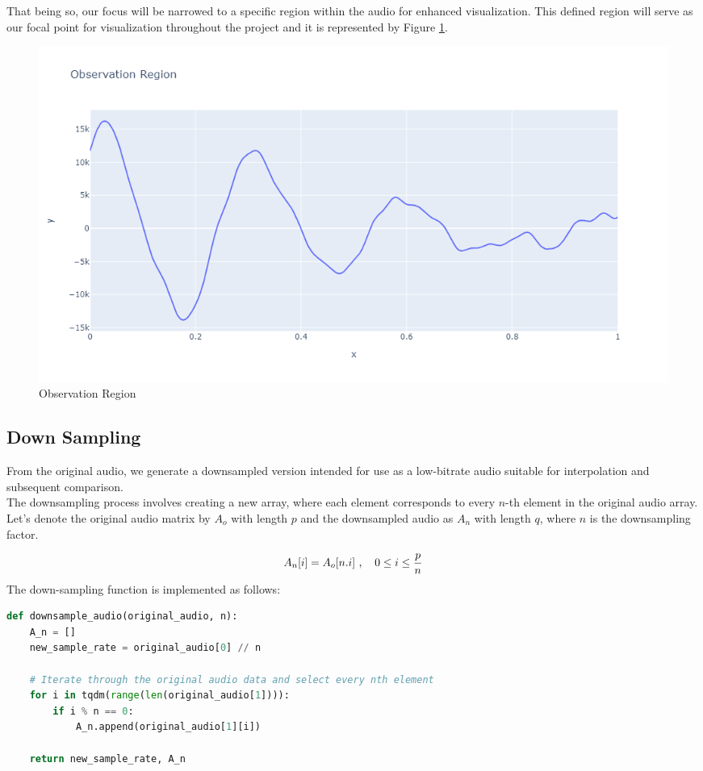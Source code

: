 \documentclass{article}
\begin{document}
That being so, our focus will be narrowed to a specific region within the audio for enhanced visualization. This defined region will serve as our focal point for visualization throughout the project and it is represented by Figure \ref{fig:Observation Region}.

\begin{figure}[h]
    \centering
    \includegraphics[width=\textwidth]{ObservationRegion.png}
    \caption{Observation Region}
    \label{fig:Observation Region}
\end{figure}
\newpage
\subsection{Down Sampling}

From the original audio, we generate a downsampled version intended for use as a low-bitrate audio suitable for interpolation and subsequent comparison.  \\

The downsampling process involves creating a new array, where each element corresponds to every $n$-th element in the original audio array. Let's denote the original audio matrix by $A_o$ with length $p$ and the downsampled audio as $A_n$ with length $q$, where $n$ is the downsampling factor.



$$ A_n[i] = A_o[n.i] \ , \   \ \  0 \leq i \leq {p \over n}$$
\noindent
The down-sampling function is implemented as follows:
\begin{lstlisting}[language=Python, caption={Down Sampling Function}]
def downsample_audio(original_audio, n):
    A_n = []
    new_sample_rate = original_audio[0] // n
    
    # Iterate through the original audio data and select every nth element
    for i in tqdm(range(len(original_audio[1]))):
        if i % n == 0:
            A_n.append(original_audio[1][i])
    
    return new_sample_rate, A_n
\end{lstlisting} 
\end{document}
